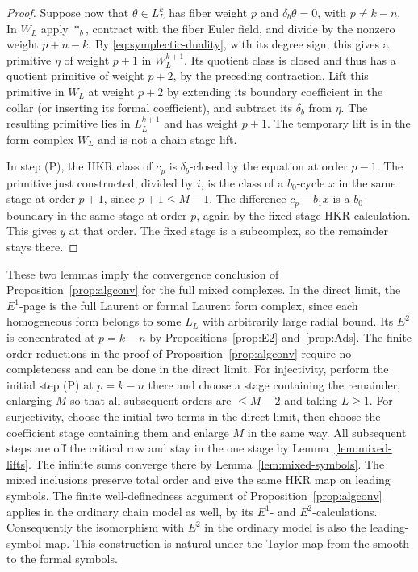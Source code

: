 \documentclass[11pt,oneside,reqno]{article}
\theoremstyle{plain}
\theoremstyle{definition}
\theoremstyle{remark}
\begin{document}
\begin{proof}
Suppose now that \(\theta\in L_L^k\) has fiber weight \(p\) and
\(\delta_b\theta=0\), with \(p\neq k-n\). In \(W_L\) apply
\(*_b\), contract with the fiber Euler field, and divide by the
nonzero weight \(p+n-k\). By
\eqref{eq:symplectic-duality}, with its degree sign, this gives a
primitive \(\eta\) of weight \(p+1\) in \(W_L^{k+1}\).
Its quotient class is closed and thus has a quotient primitive of
weight \(p+2\), by the preceding contraction. Lift this primitive
in \(W_L\) at weight \(p+2\) by extending its boundary coefficient
in the collar (or inserting its formal coefficient), and subtract
its \(\delta_b\) from \(\eta\). The resulting primitive lies in
\(L_L^{k+1}\) and has weight \(p+1\). The temporary lift is in
the form complex \(W_L\) and is not a chain-stage lift.

In step (P), the HKR class of \(c_p\) is \(\delta_b\)-closed by
the equation at order \(p-1\). The primitive just constructed,
divided by \(i\), is the class of a \(b_0\)-cycle \(x\) in the
same stage at order \(p+1\), since \(p+1\leq M-1\).
The difference \(c_p-b_1x\) is a \(b_0\)-boundary in the same
stage at order \(p\), again by the fixed-stage HKR calculation.
This gives \(y\) at that order. The fixed stage is a subcomplex,
so the remainder stays there.
\end{proof}

These two lemmas imply the convergence conclusion of
Proposition~\ref{prop:algconv} for the full mixed complexes. In
the direct limit, the \(E^1\)-page is the full Laurent or formal
Laurent form complex, since each homogeneous form belongs to some
\(L_L\) with arbitrarily large radial bound. Its \(E^2\) is
concentrated at \(p=k-n\) by Propositions~\ref{prop:E2}
and~\ref{prop:Ads}. The finite order reductions in the proof of
Proposition~\ref{prop:algconv} require no completeness and can be
done in the direct limit. For injectivity, perform the initial
step (P) at \(p=k-n\) there and choose a stage containing the
remainder, enlarging \(M\) so that all subsequent orders are
\(\leq M-2\) and taking \(L\geq1\). For surjectivity, choose the
initial two terms in the direct limit, then choose the coefficient
stage containing them and enlarge \(M\) in the same way. All
subsequent steps are off the critical row and stay in the one
stage by Lemma~\ref{lem:mixed-lifts}. The infinite sums converge
there by Lemma~\ref{lem:mixed-symbols}. The mixed inclusions
preserve total order and give the same HKR map on leading
symbols. The finite well-definedness argument of
Proposition~\ref{prop:algconv} applies in the ordinary chain
model as well, by its \(E^1\)- and \(E^2\)-calculations.
Consequently the isomorphism with \(E^2\) in the ordinary model
is also the leading-symbol map. This construction is natural
under the Taylor map from the smooth to the formal symbols.
\end{document}

